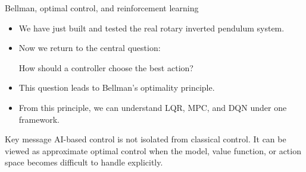 \documentclass[aspectratio=169]{beamer}
\begin{document}
\begin{frame}{Bellman, optimal control, and reinforcement learning}

\begin{itemize}
    \item We have just built and tested the real rotary inverted pendulum system.
    \vspace{0.25cm}

    \item Now we return to the central question:
    \vspace{0.15cm}
    \begin{center}
    \Large
    \textcolor{PKUDarkPurple}{How should a controller choose the best action?}
    \end{center}

    \vspace{0.2cm}

    \item This question leads to Bellman's optimality principle.
    \vspace{0.25cm}

    \item From this principle, we can understand LQR, MPC, and DQN under one framework.
\end{itemize}

\vspace{0.2cm}

\begin{block}{Key message}
\small
AI-based control is not isolated from classical control. 
It can be viewed as approximate optimal control when the model, value function, or action space becomes difficult to handle explicitly.
\end{block}

\end{frame}
\end{document}
